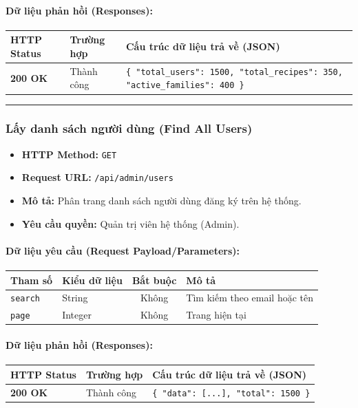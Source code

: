 \documentclass[12pt,a4paper]{article}
\begin{document}
\paragraph{Dữ liệu phản hồi (Responses):}
\begin{longtable}{|>{\raggedright\arraybackslash}p{2.8cm}|>{\raggedright\arraybackslash}p{3.2cm}|>{\raggedright\arraybackslash}p{8.0cm}|}
\hline
\textbf{HTTP Status} & \textbf{Trường hợp} & \textbf{Cấu trúc dữ liệu trả về (JSON)} \\ \hline
\endhead
\textbf{200 OK} & Thành công & \texttt{\{ "total\_users": 1500, "total\_recipes": 350, "active\_families": 400 \}} \\ \hline
\end{longtable}

\vskip 0.4cm
\noindent\rule{\textwidth}{0.3pt}
\vskip 0.4cm

\subsubsection{Lấy danh sách người dùng (Find All Users)}
\begin{itemize}[leftmargin=*]
    \item \textbf{HTTP Method:} \texttt{GET}
    \item \textbf{Request URL:} \texttt{/api/admin/users}
    \item \textbf{Mô tả:} Phân trang danh sách người dùng đăng ký trên hệ thống.
    \item \textbf{Yêu cầu quyền:} Quản trị viên hệ thống (Admin).
\end{itemize}

\paragraph{Dữ liệu yêu cầu (Request Payload/Parameters):}
\begin{longtable}{|>{\raggedright\arraybackslash}p{2.8cm}|>{\raggedright\arraybackslash}p{2.2cm}|c|>{\raggedright\arraybackslash}p{7.0cm}|}
\hline
\textbf{Tham số} & \textbf{Kiểu dữ liệu} & \textbf{Bắt buộc} & \textbf{Mô tả} \\ \hline
\endhead
\texttt{search} & String & Không & Tìm kiếm theo email hoặc tên \\ \hline
\texttt{page} & Integer & Không & Trang hiện tại \\ \hline
\end{longtable}

\paragraph{Dữ liệu phản hồi (Responses):}
\begin{longtable}{|>{\raggedright\arraybackslash}p{2.8cm}|>{\raggedright\arraybackslash}p{3.2cm}|>{\raggedright\arraybackslash}p{8.0cm}|}
\hline
\textbf{HTTP Status} & \textbf{Trường hợp} & \textbf{Cấu trúc dữ liệu trả về (JSON)} \\ \hline
\endhead
\textbf{200 OK} & Thành công & \texttt{\{ "data": [...], "total": 1500 \}} \\ \hline
\end{longtable}
\end{document}
